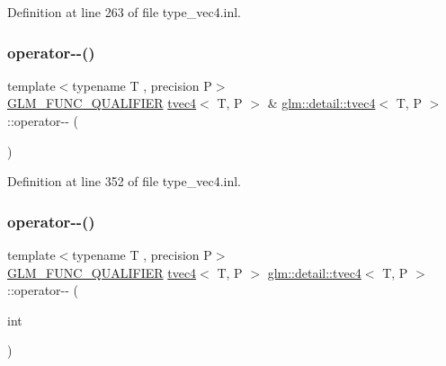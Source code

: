 Definition at line 263 of file type\+\_\+vec4.\+inl.

\mbox{\label{structglm_1_1detail_1_1tvec4_a207d975fb868347e3b1e320c71e8beeb}} 
\subsubsection{\texorpdfstring{operator-\/-\/()}{operator--()}\hspace{0.1cm}{\footnotesize\ttfamily [1/2]}}
{\footnotesize\ttfamily template$<$typename T , precision P$>$ \\
\hyperlink{setup_8hpp_a33fdea6f91c5f834105f7415e2a64407}{G\+L\+M\+\_\+\+F\+U\+N\+C\+\_\+\+Q\+U\+A\+L\+I\+F\+I\+ER} \hyperlink{structglm_1_1detail_1_1tvec4}{tvec4}$<$ T, P $>$ \& \hyperlink{structglm_1_1detail_1_1tvec4}{glm\+::detail\+::tvec4}$<$ T, P $>$\+::operator-\/-\/ (\begin{DoxyParamCaption}{ }\end{DoxyParamCaption})}



Definition at line 352 of file type\+\_\+vec4.\+inl.

\mbox{\label{structglm_1_1detail_1_1tvec4_a880ec39f85acc9bbac0fe842670bec57}} 
\subsubsection{\texorpdfstring{operator-\/-\/()}{operator--()}\hspace{0.1cm}{\footnotesize\ttfamily [2/2]}}
{\footnotesize\ttfamily template$<$typename T , precision P$>$ \\
\hyperlink{setup_8hpp_a33fdea6f91c5f834105f7415e2a64407}{G\+L\+M\+\_\+\+F\+U\+N\+C\+\_\+\+Q\+U\+A\+L\+I\+F\+I\+ER} \hyperlink{structglm_1_1detail_1_1tvec4}{tvec4}$<$ T, P $>$ \hyperlink{structglm_1_1detail_1_1tvec4}{glm\+::detail\+::tvec4}$<$ T, P $>$\+::operator-\/-\/ (\begin{DoxyParamCaption}\item[{int}]{ }\end{DoxyParamCaption})}



